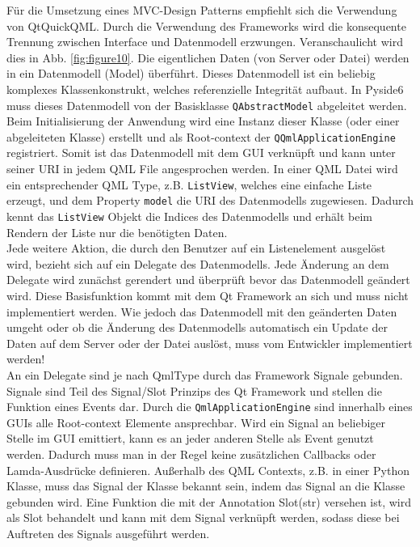 Für die Umsetzung eines MVC-Design Patterns empfiehlt sich die Verwendung von QtQuickQML.
Durch die Verwendung des Frameworks wird die konsequente Trennung zwischen Interface und Datenmodell erzwungen.
Veranschaulicht wird dies in Abb. \ref{fig:figure10}.
Die eigentlichen Daten (von Server oder Datei) werden in ein Datenmodell (Model) überführt.
Dieses Datenmodell ist ein beliebig komplexes Klassenkonstrukt, welches referenzielle Integrität aufbaut.
In Pyside6 muss dieses Datenmodell von der Basisklasse \verb|QAbstractModel| abgeleitet werden.
Beim Initialisierung der Anwendung wird eine Instanz dieser Klasse (oder einer abgeleiteten Klasse) erstellt und als
Root-context der \verb|QQmlApplicationEngine| registriert.
Somit ist das Datenmodell mit dem GUI verknüpft und kann unter seiner URI in jedem QML File angesprochen werden.
In einer QML Datei wird ein entsprechender QML Type, z.B. \verb|ListView|, welches eine einfache Liste erzeugt,
und dem Property \verb|model| die URI des Datenmodells zugewiesen.
Dadurch kennt das \verb|ListView| Objekt die Indices des Datenmodells und erhält beim Rendern der Liste nur die benötigten
Daten.\\
Jede weitere Aktion, die durch den Benutzer auf ein Listenelement ausgelöst wird, bezieht sich auf ein Delegate des Datenmodells.
Jede Änderung an dem Delegate wird zunächst gerendert und überprüft bevor das Datenmodell geändert wird.
Diese Basisfunktion kommt mit dem Qt Framework an sich und muss nicht implementiert werden.
Wie jedoch das Datenmodell mit den geänderten Daten umgeht oder ob die Änderung des Datenmodells automatisch ein Update
der Daten auf dem Server oder der Datei auslöst, muss vom Entwickler implementiert werden!\\
An ein Delegate sind je nach QmlType durch das Framework Signale gebunden.
Signale sind Teil des Signal/Slot Prinzips des Qt Framework \cite{pysideSignalSlot} und stellen die Funktion eines Events dar.
Durch die \verb|QmlApplicationEngine| sind innerhalb eines GUIs alle Root-context Elemente ansprechbar.
Wird ein Signal an beliebiger Stelle im GUI emittiert, kann es an jeder anderen Stelle als Event genutzt werden.
Dadurch muss man  in der Regel keine zusätzlichen Callbacks oder Lamda-Ausdrücke definieren.
Außerhalb des QML Contexts, z.B. in einer Python Klasse, muss das Signal der Klasse bekannt sein, indem das Signal an die Klasse
gebunden wird.
Eine Funktion die mit der Annotation \glqq Slot(str) \grqq versehen ist, wird als Slot behandelt und kann mit dem Signal
verknüpft werden, sodass diese bei Auftreten des Signals ausgeführt werden.
